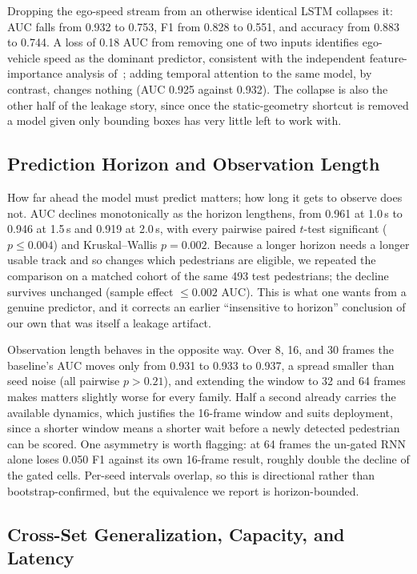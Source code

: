 \documentclass[mti,article,submit,moreauthors]{Definitions/mdpi}
\begin{document}
Dropping the ego-speed stream from an otherwise identical LSTM collapses it: AUC falls from 0.932 to 0.753, F1 from 0.828 to 0.551, and accuracy from 0.883 to 0.744. A loss of 0.18 AUC from removing one of two inputs identifies ego-vehicle speed as the dominant predictor, consistent with the independent feature-importance analysis of~\citet{azarmi2024featureimportance}; adding temporal attention to the same model, by contrast, changes nothing (AUC 0.925 against 0.932). The collapse is also the other half of the leakage story, since once the static-geometry shortcut is removed a model given only bounding boxes has very little left to work with.

\subsection{Prediction Horizon and Observation Length}
\label{sec:horizon}

How far ahead the model must predict matters; how long it gets to observe does not. AUC declines monotonically as the horizon lengthens, from 0.961 at 1.0\,s to 0.946 at 1.5\,s and 0.919 at 2.0\,s, with every pairwise paired $t$-test significant ($p \le 0.004$) and Kruskal--Wallis $p = 0.002$. Because a longer horizon needs a longer usable track and so changes which pedestrians are eligible, we repeated the comparison on a matched cohort of the same 493 test pedestrians; the decline survives unchanged (sample effect $\le 0.002$ AUC). This is what one wants from a genuine predictor, and it corrects an earlier ``insensitive to horizon'' conclusion of our own that was itself a leakage artifact.

Observation length behaves in the opposite way. Over 8, 16, and 30 frames the baseline's AUC moves only from 0.931 to 0.933 to 0.937, a spread smaller than seed noise (all pairwise $p > 0.21$), and extending the window to 32 and 64 frames makes matters slightly worse for every family. Half a second already carries the available dynamics, which justifies the 16-frame window and suits deployment, since a shorter window means a shorter wait before a newly detected pedestrian can be scored. One asymmetry is worth flagging: at 64 frames the un-gated RNN alone loses 0.050 F1 against its own 16-frame result, roughly double the decline of the gated cells. Per-seed intervals overlap, so this is directional rather than bootstrap-confirmed, but the equivalence we report is horizon-bounded.


\subsection{Cross-Set Generalization, Capacity, and Latency}
\label{sec:loso}
\end{document}
